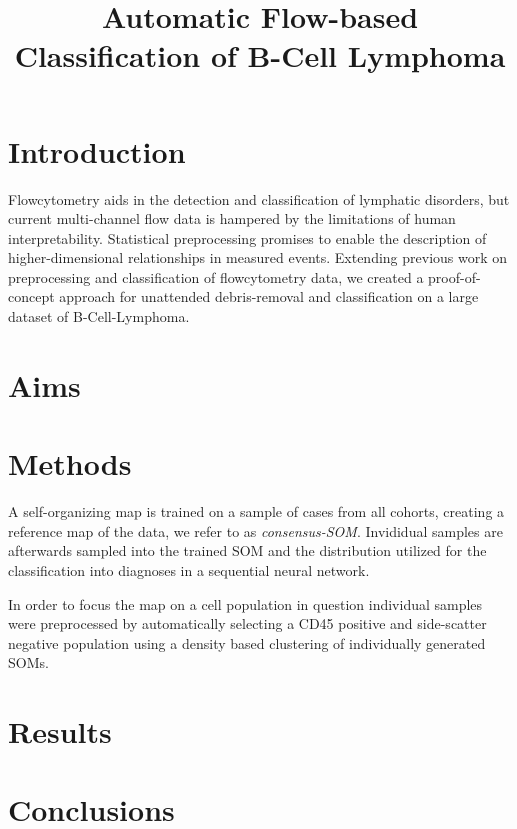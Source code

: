 \documentclass[11pt,a4paper]{article}
\begin{document}
\title{Automatic Flow-based Classification of B-Cell Lymphoma}

\section{Introduction}

Flowcytometry aids in the detection and classification of lymphatic disorders, but current multi-channel flow data is hampered by the limitations of human interpretability.
Statistical preprocessing promises to enable the description of higher-dimensional relationships in measured events.
Extending previous work on preprocessing and classification of flowcytometry data, we created a proof-of-concept approach for unattended debris-removal and classification on a large dataset of B-Cell-Lymphoma.

\section{Aims}



\section{Methods}

A self-organizing map is trained on a sample of cases from all cohorts, creating a reference map of the data, we refer to as \emph{consensus-SOM}.
Invididual samples are afterwards sampled into the trained SOM and the distribution utilized for the classification into diagnoses in a sequential neural network.

In order to focus the map on a cell population in question individual samples were preprocessed by automatically selecting a CD45 positive and side-scatter negative population using a density based clustering of individually generated SOMs.


\section{Results}


\section{Conclusions}
\end{document}
